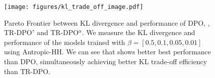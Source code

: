 \begin{figure}[!t]
  \texttt{[image: figures/kl\_trade\_off\_image.pdf]}
  \caption{Pareto Frontier between KL divergence and performance of DPO, \method{}, TR-DPO$^\tau$ and TR-DPO$^\alpha$. We measure the KL divergence and performance of the models trained with $\beta=[0.5, 0.1, 0.05, 0.01]$ using Antropic-HH. We can see that \method{} shows better best performance than DPO, simultaneously achieving better KL trade-off efficiency than TR-DPO.}
  \label{fig:kl_trade_off}
\end{figure}